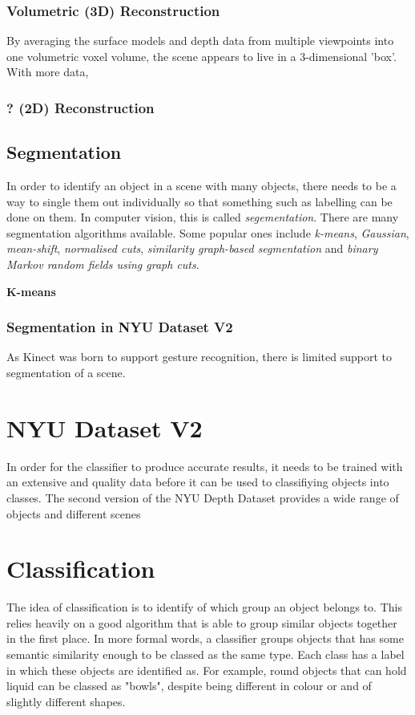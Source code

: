 \documentclass[11pt,openright,a4paper]{report}
\begin{document}
\subsection{Volumetric (3D) Reconstruction}
By averaging the surface models and depth data from multiple viewpoints into one volumetric voxel volume, the scene appears to live in a 3-dimensional 'box'. With more data,

\subsection{? (2D) Reconstruction} 

\section{Segmentation}
In order to identify an object in a scene with many objects, there needs to be a way to single them out individually so that something such as labelling can be done on them. In computer vision, this is called \textit{segementation}. There are many segmentation algorithms available. Some popular ones include \textit{k-means}, \textit{Gaussian}, \textit{mean-shift}, \textit{normalised cuts}, \textit{similarity graph-based segmentation} and \textit{binary Markov random fields using graph cuts}.


\large\textbf{K-means}

\subsection{Segmentation in NYU Dataset V2}
As Kinect was born to support gesture recognition, there is limited support to segmentation of a scene.  

\newpage


\chapter{NYU Dataset V2}
In order for the classifier to produce accurate results, it needs to be trained with an extensive and quality data before it can be used to classifiying objects into classes. The second version of the NYU Depth Dataset provides a wide range of objects and different scenes
\newpage


\chapter{Classification}
The idea of classification is to identify of which group an object belongs to. This relies heavily on a good algorithm that is able to group similar objects together in the first place. In more formal words, a classifier groups objects that has some semantic similarity enough to be classed as the same type. Each class has a label in which these objects are identified as. For example, round objects that can hold liquid can be classed as "bowls", despite being different in colour or and of slightly different shapes.
\end{document}
